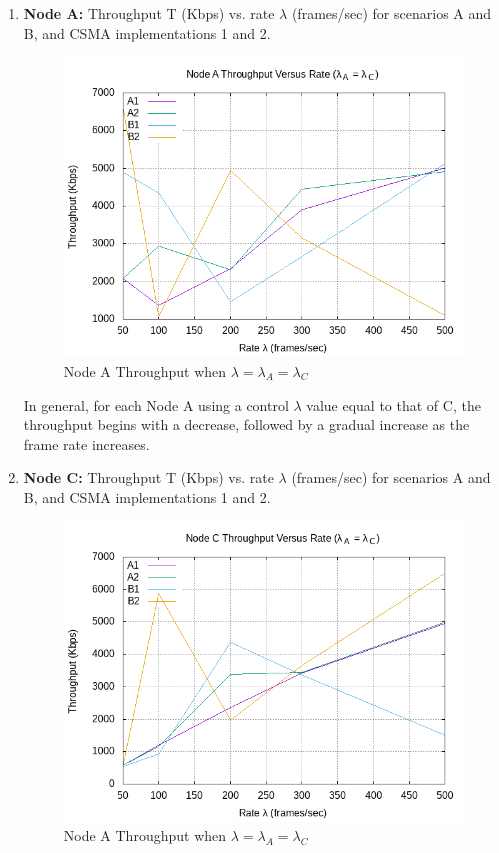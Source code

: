\documentclass[11pt]{article}
\begin{document}
\renewcommand{\labelenumi}{{\bf\alph{enumi})}}
\begin{enumerate}
\item {\bf Node A:} Throughput T (Kbps) vs. rate \(\lambda{}\) (frames/sec) for scenarios A and B, and CSMA
implementations 1 and 2.
\begin{figure}[htp]
    \centering
    \includegraphics[width=5in]{1A.png}
    \caption{Node A Throughput when \(\lambda{} = \lambda{}_A = \lambda{}_C\) }
    \label{fig:1A}
\end{figure}

In general, for each Node A using a control \(\lambda{}\) value equal to that of C, the throughput begins with a decrease, followed by a gradual increase as the frame rate increases.


\item {\bf Node C:} Throughput T (Kbps) vs. rate \(\lambda{}\) (frames/sec) for scenarios A and B, and CSMA
implementations 1 and 2.

\begin{figure}[htp]
    \centering
    \includegraphics[width=5in]{1B.png}
    \caption{Node A Throughput when \(\lambda{} = \lambda{}_A = \lambda{}_C\) }
    \label{fig:1A}
\end{figure}

\end{enumerate}
\end{document}
